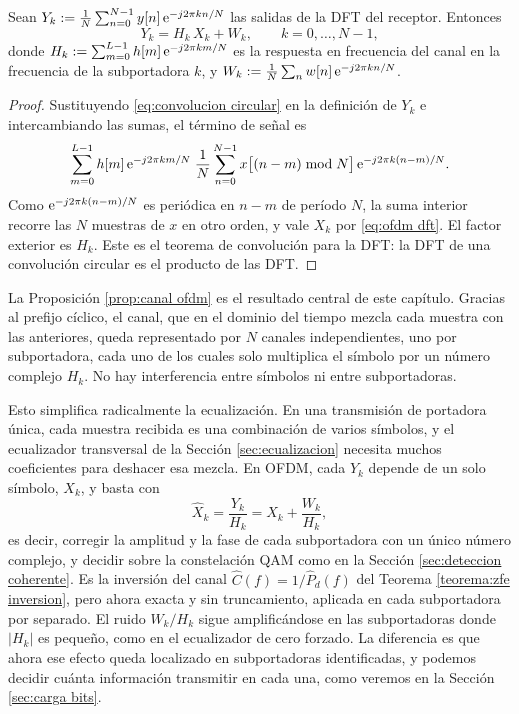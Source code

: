 \begin{proposicion}\label{prop:canal ofdm}
Sean $Y_k := \frac{1}{N}\sum_{n=0}^{N-1}y[n]\,\mathrm{e}^{-j2\pi kn/N}$ las salidas de la DFT del receptor. Entonces
\begin{equation}\label{eq:canal ofdm}
    Y_k = H_k\,X_k + W_k, \qquad k=0,\ldots,N-1,
\end{equation}
donde $H_k:=\sum_{m=0}^{L-1}h[m]\,\mathrm{e}^{-j2\pi km/N}$ es la respuesta en frecuencia del canal en la frecuencia de la subportadora $k$, y $W_k:=\frac{1}{N}\sum_{n}w[n]\,\mathrm{e}^{-j2\pi kn/N}$.
\end{proposicion}
\begin{proof}
Sustituyendo \eqref{eq:convolucion circular} en la definición de $Y_k$ e intercambiando las sumas, el término de señal es
\begin{equation*}
    \sum_{m=0}^{L-1} h[m]\,\mathrm{e}^{-j2\pi km/N}\;\frac{1}{N}\sum_{n=0}^{N-1} x\big[(n-m)\bmod N\big]\,\mathrm{e}^{-j2\pi k(n-m)/N}.
\end{equation*}
Como $\mathrm{e}^{-j2\pi k(n-m)/N}$ es periódica en $n-m$ de período $N$, la suma interior recorre las $N$ muestras de $x$ en otro orden, y vale $X_k$ por \eqref{eq:ofdm dft}. El factor exterior es $H_k$. Este es el teorema de convolución para la DFT: la DFT de una convolución circular es el producto de las DFT.
\end{proof}

La Proposición \ref{prop:canal ofdm} es el resultado central de este capítulo. Gracias al prefijo cíclico, el canal, que en el dominio del tiempo mezcla cada muestra con las anteriores, queda representado por $N$ canales independientes, uno por subportadora, cada uno de los cuales solo multiplica el símbolo por un número complejo $H_k$. No hay interferencia entre símbolos ni entre subportadoras.

Esto simplifica radicalmente la ecualización. En una transmisión de portadora única, cada muestra recibida es una combinación de varios símbolos, y el ecualizador transversal de la Sección \ref{sec:ecualizacion} necesita muchos coeficientes para deshacer esa mezcla. En OFDM, cada $Y_k$ depende de un solo símbolo, $X_k$, y basta con
\begin{equation*}
    \hat X_k = \frac{Y_k}{H_k} = X_k + \frac{W_k}{H_k},
\end{equation*}
es decir, corregir la amplitud y la fase de cada subportadora con un único número complejo, y decidir sobre la constelación QAM como en la Sección \ref{sec:deteccion coherente}. Es la inversión del canal $\hat C(f)=1/\hat P_d(f)$ del Teorema \ref{teorema:zfe inversion}, pero ahora exacta y sin truncamiento, aplicada en cada subportadora por separado. El ruido $W_k/H_k$ sigue amplificándose en las subportadoras donde $|H_k|$ es pequeño, como en el ecualizador de cero forzado. La diferencia es que ahora ese efecto queda localizado en subportadoras identificadas, y podemos decidir cuánta información transmitir en cada una, como veremos en la Sección \ref{sec:carga bits}.

